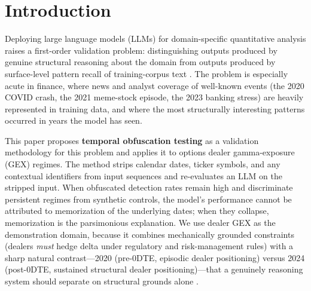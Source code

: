 \documentclass[jrfm,article,accept,moreauthors,pdftex]{Definitions/mdpi}
\begin{document}
\section{Introduction}
\label{sec:introduction}

Deploying large language models (LLMs) for domain-specific quantitative analysis raises a first-order validation problem: distinguishing outputs produced by genuine structural reasoning about the domain from outputs produced by surface-level pattern recall of training-corpus text \citep{mccoy2023embers}. The problem is especially acute in finance, where news and analyst coverage of well-known events (the 2020 COVID crash, the 2021 meme-stock episode, the 2023 banking stress) are heavily represented in training data, and where the most structurally interesting patterns occurred in years the model has seen.

This paper proposes \textbf{{temporal obfuscation testing}} %
as a validation methodology for this problem and applies it to options dealer gamma-exposure (GEX) regimes. The method strips calendar dates, ticker symbols, and any contextual identifiers from input sequences and re-evaluates an LLM on the stripped input. When obfuscated detection rates remain high and discriminate persistent regimes from synthetic controls, the model's performance cannot be attributed to memorization of the underlying dates; when they collapse, memorization is the parsimonious explanation. We use dealer GEX as the demonstration domain, because it combines mechanically grounded constraints (dealers \emph{{must}} %
hedge delta under regulatory and risk-management rules) with a sharp natural contrast---2020 (pre-0DTE, episodic dealer positioning) versus 2024 (post-0DTE, sustained structural dealer positioning)---that a genuinely reasoning system should separate on structural grounds alone \citep{ni2005stock,garleanu2009demand,dim2023odtes}.
\end{document}
